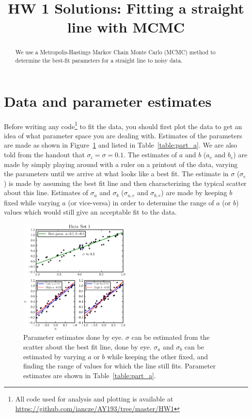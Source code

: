 \documentclass[iop,floatfix]{emulateapj}
\begin{document}
\title{HW 1 Solutions: Fitting a straight line with MCMC}
\author{}

\begin{abstract}
We use a Metropolis-Hastings Markov Chain Monte Carlo (MCMC) method to determine the best-fit parameters for a straight line to noisy data.
\end{abstract}

\section{Data and parameter estimates}
Before writing any code\footnote{All code used for analysis and plotting is available at \url{https://github.com/iancze/AY193/tree/master/HW1}} to fit the data, you should first plot the data to get an idea of what parameter space you are dealing with. Estimates of the parameters are made as shown in Figure~\ref{fig:basic_plot} and listed in Table~\ref{table:part_a}. We are also told from the handout that $\sigma_i = \sigma = 0.1$. The estimates of $a$ and $b$ ($a_e$ and $b_e$) are made by simply playing around with a ruler on a printout of the data, varying the parameters until we arrive at what looks like a best fit. The estimate in $\sigma$ ($\sigma_e$) is made by assuming the best fit line and then characterizing the typical scatter about this line. Estimates of $\sigma_a$ and $\sigma_b$ ($\sigma_{a,e}$ and $\sigma_{b,e}$) are made by keeping $b$ fixed while varying $a$ (or vice-versa) in order to determine the range of $a$ (or $b$) values which would still give an acceptable fit to the data. 

\begin{figure}
\begin{center}
  \includegraphics[width=0.5\textwidth]{basic_plot}
  \caption{Parameter estimates done by eye. $\sigma$ can be estimated from the scatter about the best fit line, done by eye. $\sigma_a$ and $\sigma_b$ can be estimated by varying $a$ or $b$ while keeping the other fixed, and finding the range of values for which the line still fits. Parameter estimates are shown in Table~\ref{table:part_a}.}
\label{fig:basic_plot}
\end{center}
\end{figure}
\end{document}
